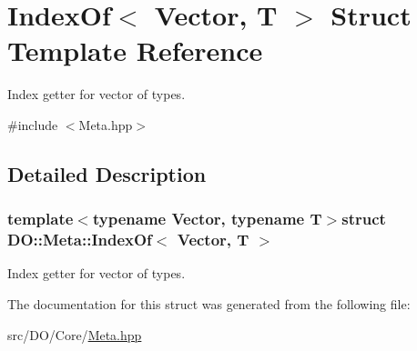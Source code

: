 \hypertarget{struct_d_o_1_1_meta_1_1_index_of}{\section{Index\-Of$<$ Vector, T $>$ Struct Template Reference}
\label{struct_d_o_1_1_meta_1_1_index_of}
}


Index getter for vector of types.  




{\ttfamily \#include $<$Meta.\-hpp$>$}



\subsection{Detailed Description}
\subsubsection*{template$<$typename Vector, typename T$>$struct D\-O\-::\-Meta\-::\-Index\-Of$<$ Vector, T $>$}

Index getter for vector of types. 

The documentation for this struct was generated from the following file\-:\begin{DoxyCompactItemize}
\item 
src/\-D\-O/\-Core/\hyperlink{_meta_8hpp}{Meta.\-hpp}\end{DoxyCompactItemize}
